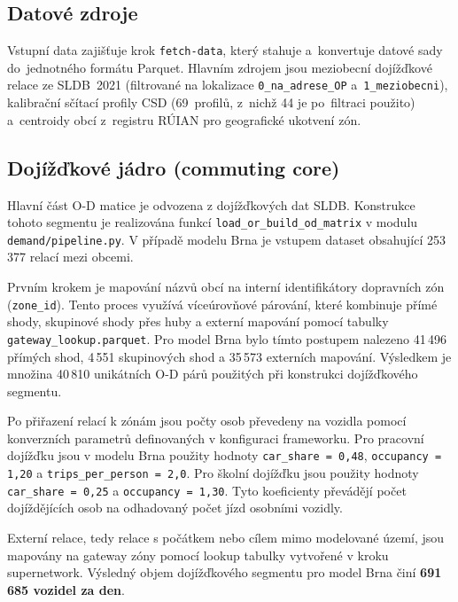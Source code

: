 \subsection{Datové zdroje}
\label{sec:impl-demand-sources}

Vstupní data zajišťuje krok \texttt{fetch-data}, který stahuje a~konvertuje datové sady do~jednotného formátu Parquet. Hlavním zdrojem jsou meziobecní dojížďkové relace ze SLDB~2021 (filtrované na lokalizace \texttt{0\_na\_adrese\_OP} a~\texttt{1\_meziobecni}), kalibrační sčítací profily CSD (69~profilů, z~nichž 44 je po~filtraci použito) a~centroidy obcí z~registru RÚIAN pro geografické ukotvení zón.

\subsection{Dojížďkové jádro (commuting core)}
\label{sec:impl-demand-commuting}

Hlavní část O-D matice je odvozena z dojížďkových dat SLDB. Konstrukce tohoto segmentu je realizována funkcí \texttt{load\_or\_build\_od\_matrix} v modulu \texttt{demand/pipeline.py}. V případě modelu Brna je vstupem dataset obsahující 253\,377 relací mezi obcemi.

Prvním krokem je mapování názvů obcí na interní identifikátory dopravních zón (\texttt{zone\_id}). Tento proces využívá víceúrovňové párování, které kombinuje přímé shody, skupinové shody přes huby a externí mapování pomocí tabulky \texttt{gateway\_lookup.parquet}. Pro model Brna bylo tímto postupem nalezeno 41\,496 přímých shod, 4\,551 skupinových shod a 35\,573 externích mapování. Výsledkem je množina 40\,810 unikátních O-D párů použitých při konstrukci dojížďkového segmentu.

Po přiřazení relací k zónám jsou počty osob převedeny na vozidla pomocí konverzních parametrů definovaných v konfiguraci frameworku. Pro pracovní dojížďku jsou v modelu Brna použity hodnoty \texttt{car\_share = 0{,}48}, \texttt{occupancy = 1{,}20} a \texttt{trips\_per\_person = 2{,}0}. Pro školní dojížďku jsou použity hodnoty \texttt{car\_share = 0{,}25} a \texttt{occupancy = 1{,}30}. Tyto koeficienty převádějí počet dojíždějících osob na odhadovaný počet jízd osobními vozidly.

Externí relace, tedy relace s počátkem nebo cílem mimo modelované území, jsou mapovány na gateway zóny pomocí lookup tabulky vytvořené v kroku supernetwork. Výsledný objem dojížďkového segmentu pro model Brna činí \textbf{691\,685 vozidel za den}.

